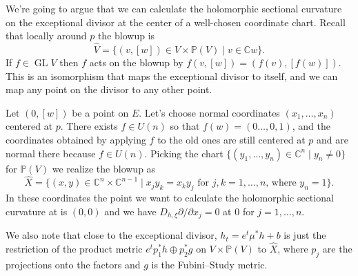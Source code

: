 \documentclass[10pt,a4paper]{amsart}
\newcommand{\kk}[1]{\mathbb{#1}}
\DeclareMathOperator{\GL}{GL}
\def\hsc{holomorphic sectional curvature}
\def\bl#1{\widehat{#1}}
\begin{document}
We're going to argue that we can calculate the \hsc{} on the exceptional divisor
at the center of a well-chosen coordinate chart.
Recall that locally around $p$ the blowup is
$$
\bl V
= \{ (v,[w]) \in V \times \kk P(V) \mid v \in \kk C w \}.
$$
If $f \in \GL V$ then $f$ acts on the blowup by $f(v, [w]) = (f(v), [f(w)])$.
This is an isomorphism that maps the exceptional divisor to itself, and we can
map any point on the divisor to any other point.

Let $(0, [w])$ be a point on $E$.
Let's choose normal coordinates $(x_1,\ldots,x_n)$ centered at $p$.
There exists $f \in U(n)$ so that $f(w) = (0 \ldots, 0, 1)$, and the
coordinates obtained by applying $f$ to the old ones are still centered at $p$
and are normal there because $f \in U(n)$.
Picking the chart $\{(y_1, \ldots, y_n) \in \kk C^n \mid y_n \not= 0 \}$ for
$\kk P(V)$
we realize the blowup as
$$
\bl X
= \{ (x,y) \in \kk C^n \times \kk C^{n-1}
\mid x_j y_k = x_k y_j \text{ for $j,k = 1,\ldots,n$, where $y_n = 1$}  \}.
$$
In these coordinates the point we want to calculate the \hsc{} at is $(0,0)$
and we have $D_{h,\xi} \partial / \partial x_j = 0$ at $0$ for $j = 1, \ldots, n$.

We also note that close to the exceptional divisor, $h_t = e^t \mu^* h + b$ is
just the restriction of the product metric $e^t p_1^* h \oplus p_2^* g$ on
$V \times \kk P(V)$ to $\bl X$, where $p_j$ are the projections onto the
factors and $g$ is the Fubini--Study metric.
\end{document}
